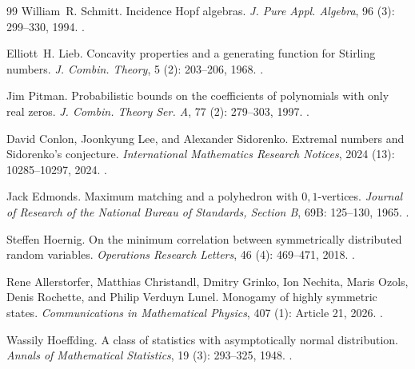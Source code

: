 \documentclass[a4paper,11pt,reqno]{amsart}
\theoremstyle{plain}
\theoremstyle{definition}
\theoremstyle{remark}
\begin{document}
\begin{thebibliography}{99}
William~R. Schmitt.
\newblock Incidence Hopf algebras.
\newblock \emph{J. Pure Appl. Algebra}, 96 (3): 299--330, 1994.
\newblock {}.

Elliott~H. Lieb.
\newblock Concavity properties and a generating function for Stirling numbers.
\newblock \emph{J. Combin. Theory}, 5 (2): 203--206, 1968.
\newblock {}.

Jim Pitman.
\newblock Probabilistic bounds on the coefficients of polynomials with only real zeros.
\newblock \emph{J. Combin. Theory Ser. A}, 77 (2): 279--303, 1997.
\newblock {}.

David Conlon, Joonkyung Lee, and Alexander Sidorenko.
\newblock Extremal numbers and {Sidorenko}'s conjecture.
\newblock \emph{International Mathematics Research Notices},
  2024 (13): 10285--10297, 2024.
\newblock {}.

Jack Edmonds.
\newblock Maximum matching and a polyhedron with {$0,1$}-vertices.
\newblock \emph{Journal of Research of the National Bureau of Standards,
  Section B}, 69B: 125--130, 1965.
\newblock {}.

Steffen Hoernig.
\newblock On the minimum correlation between symmetrically distributed
  random variables.
\newblock \emph{Operations Research Letters}, 46 (4):
  469--471, 2018.
\newblock {}.

Rene Allerstorfer, Matthias Christandl, Dmitry Grinko, Ion Nechita,
  Maris Ozols, Denis Rochette, and Philip Verduyn Lunel.
\newblock Monogamy of highly symmetric states.
\newblock \emph{Communications in Mathematical Physics},
  407 (1): Article 21, 2026.
\newblock {}.

Wassily Hoeffding.
\newblock A class of statistics with asymptotically normal distribution.
\newblock \emph{Annals of Mathematical Statistics},
  19 (3): 293--325, 1948.
\newblock {}.


\end{thebibliography}
\end{document}
